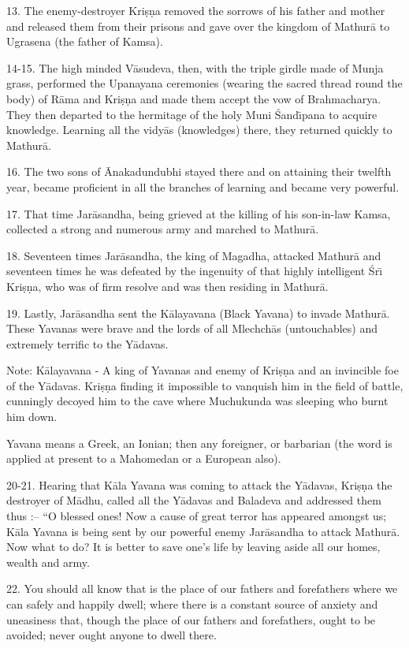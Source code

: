 13. The enemy-destroyer Kri\d{s}\d{n}a removed the sorrows of his father and mother and released them from their prisons and gave over the kingdom of Mathur\=a to Ugrasena (the father of Kamsa).

14-15. The high minded V\=asudeva, then, with the triple girdle made of Munja grass, performed the Upanayana ceremonies (wearing the sacred thread round the body) of R\=ama and Kri\d{s}\d{n}a and made them accept the vow of Brahmacharya. They then departed to the hermitage of the holy Muni \'Sand\={\i}pana to acquire knowledge. Learning all the vidy\=as (knowledges) there, they returned quickly to Mathur\=a.

16. The two sons of \=Anakadundubhi stayed there and on attaining their twelfth year, became proficient in all the branches of learning and became very powerful.

17. That time Jar\=asandha, being grieved at the killing of his son-in-law Kamsa, collected a strong and numerous army and marched to Mathur\=a.

18. Seventeen times Jar\=asandha, the king of Magadha, attacked Mathur\=a and seventeen times he was defeated by the ingenuity of that highly intelligent \'Sr\={\i} Kri\d{s}\d{n}a, who was of firm resolve and was then residing in Mathur\=a.

19. Lastly, Jar\=asandha sent the K\=alayavana (Black Yavana) to invade Mathur\=a. These Yavanas were brave and the lords of all Mlechch\=as (untouchables) and extremely terrific to the Y\=adavas.

Note: K\=alayavana - A king of Yavanas and enemy of Kri\d{s}\d{n}a and an invincible foe of the Y\=adavas. Kri\d{s}\d{n}a finding it impossible to vanquish him in the field of battle, cunningly decoyed him to the cave where Muchukunda was sleeping who burnt him down.

Yavana means a Greek, an Ionian; then any foreigner, or barbarian (the word is applied at present to a Mahomedan or a European also).

20-21. Hearing that K\=ala Yavana was coming to attack the Y\=adavas, Kri\d{s}\d{n}a the destroyer of M\=adhu, called all the Y\=adavas and Baladeva and addressed them thus :-- ``O blessed ones! Now a cause of great terror has appeared amongst us; K\=ala Yavana is being sent by our powerful enemy Jar\=asandha to attack Mathur\=a. Now what to do? It is better to save one's life by leaving aside all our homes, wealth and army.

22. You should all know that is the place of our fathers and forefathers where we can safely and happily dwell; where there is a constant source of anxiety and uneasiness that, though the place of our fathers and forefathers, ought to be avoided; never ought anyone to dwell there.

